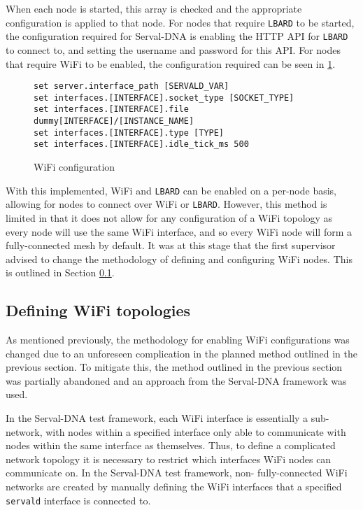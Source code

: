 When each node is started, this array is checked and the appropriate configuration is applied to that node.
For nodes that require \texttt{LBARD} to be started, the configuration required for Serval-DNA is enabling the HTTP API for \texttt{LBARD} to connect to, and setting the username and password for this API.
For nodes that require WiFi to be enabled, the configuration required can be seen in \figurename{ \ref{fig:chapter4WifiConfig}}.

\begin{figure}
    \begin{centering}
\begin{lstlisting}[basicstyle=\small, breaklines, frame=single]
set server.interface_path [SERVALD_VAR]
set interfaces.[INTERFACE].socket_type [SOCKET_TYPE]
set interfaces.[INTERFACE].file dummy[INTERFACE]/[INSTANCE_NAME]
set interfaces.[INTERFACE].type [TYPE]
set interfaces.[INTERFACE].idle_tick_ms 500
\end{lstlisting}
        \caption{WiFi configuration}
        \label{fig:chapter4WifiConfig}
    \end{centering}
\end{figure}

With this implemented, WiFi and \texttt{LBARD} can be enabled on a per-node basis, allowing for nodes to connect over WiFi or \texttt{LBARD}.
However, this method is limited in that it does not allow for any configuration of a WiFi topology as every node will use the same WiFi interface, and so every WiFi node will form a fully-connected mesh by default.
It was at this stage that the first supervisor advised to change the methodology of defining and configuring WiFi nodes.
This is outlined in Section \ref{subsection:DefiningWiFi}.


\subsection{Defining WiFi topologies}
\label{subsection:DefiningWiFi}
As mentioned previously, the methodology for enabling WiFi configurations was changed due to an unforeseen complication in the planned method outlined in the previous section.
To mitigate this, the method outlined in the previous section was partially abandoned and an approach from the Serval-DNA framework was used.

In the Serval-DNA test framework, each WiFi interface is essentially a sub-network, with nodes within a specified interface only able to communicate with nodes within the same interface as themselves.
Thus, to define a complicated network topology it is necessary to restrict which interfaces WiFi nodes can communicate on.
In the Serval-DNA test framework, non- fully-connected WiFi networks are created by manually defining the WiFi interfaces that a specified \texttt{servald} interface is connected to.


